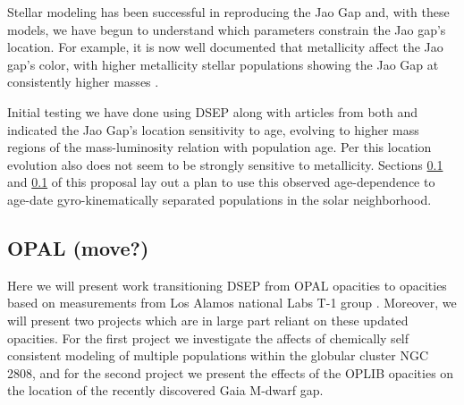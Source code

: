Stellar modeling has been successful in reproducing the Jao Gap
\citep[e.g.][]{Feiden2021,Mansfield2021} and, with these models, we have begun
to understand which parameters constrain the Jao gap's location. For example,
it is now well documented that metallicity affect the Jao gap's color, with
higher metallicity stellar populations showing the Jao Gap at consistently
higher masses \citep{Mansfield2021}.

Initial testing we have done using DSEP along with articles from both
\citeauthor{Feiden2021} and \citeauthor{Mansfield2021} indicated the Jao Gap's
location sensitivity to age, evolving to higher mass regions of the
mass-luminosity relation with population age. Per \citet{Mansfield2021} this
location evolution also does not seem to be strongly sensitive to metallicity.
Sections \ref{} and \ref{} of this proposal lay out a plan to use this observed
age-dependence to age-date gyro-kinematically separated populations in the solar
neighborhood.

\subsection{OPAL (move?)}
Here we will present work transitioning DSEP from OPAL opacities to opacities
based on measurements from Los Alamos national Labs T-1 group
\citep[OPLIB][]{Colgan2016}. Moreover, we will present two projects which are
in large part reliant on these updated opacities. For the first project we
investigate the affects of chemically self consistent modeling of multiple
populations within the globular cluster NGC 2808, and for the second project we
present the effects of the OPLIB opacities on the location of the recently
discovered Gaia M-dwarf gap.





